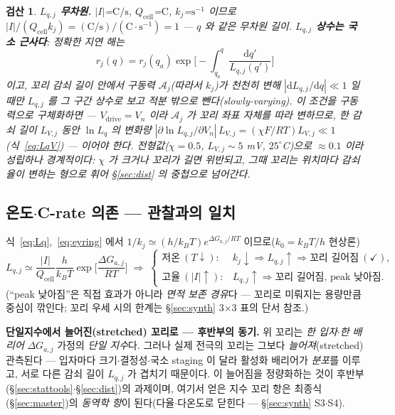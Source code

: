 \documentclass[11pt,a4paper]{article}
\newtheorem*{verifybox}{검산}
\newcommand{\dd}{\mathrm{d}}
\newcommand{\drive}{\mathrm{drive}}
\newcommand{\cell}{\mathrm{cell}}
\begin{document}
\begin{verifybox}
\textbf{$L_{q,j}$ 무차원.} $|I|$=$\mathrm{C/s}$, $Q_\cell$=$\mathrm C$, $k_j$=$\mathrm{s^{-1}}$ 이므로
$|I|/(Q_\cell k_j)=(\mathrm{C/s})/(\mathrm C\cdot\mathrm{s^{-1}})=1$ — $q$ 와 같은 무차원 길이. \textbf{$L_{q,j}$ 상수는
\emph{국소 근사}다}: 정확한 지연 해는
\[ r_j(q)=r_j(q_a)\exp\!\Big[-\int_{q_a}^q\frac{\dd q'}{L_{q,j}(q')}\Big] \]
이고, 꼬리 감쇠 길이 안에서 구동력 $\mathcal A_j$(따라서 $k_j$)가 천천히 변해 $|\dd L_{q,j}/\dd q|\ll1$ 일 때만 $L_{q,j}$ 를
그 구간 상수로 보고 적분 밖으로 뺀다(slowly-varying). 이 조건을 구동력으로 구체화하면 — $V_\drive=V_n$ 이라 $\mathcal A_j$
가 꼬리 좌표 자체를 따라 변하므로, 한 감쇠 길이 $L_{V,j}$ 동안 $\ln L_q$ 의 변화량
$|\partial\ln L_{q,j}/\partial V_n|\,L_{V,j}=(\chi F/RT)L_{V,j}\ll1$(식~\eqref{eq:LqV}) — 이어야 한다. 전형값($\chi=0.5$,
$L_{V,j}\sim5$ mV, $25^\circ$C)으로 $\approx0.1$ 이라 성립하나 \emph{경계적}이다: $\chi$ 가 크거나 꼬리가 길면 위반되고,
그때 꼬리는 위치마다 감쇠율이 변하는 형으로 휘어 \S\ref{sec:dist} 의 중첩으로 넘어간다.
\end{verifybox}

\subsection{온도$\cdot$C-rate 의존 — 관찰과의 일치}
식~\eqref{eq:Lq},~\eqref{eq:eyring} 에서 $1/k_j\simeq(h/k_BT)e^{\Delta G_{a,j}/RT}$ 이므로($k_0=k_BT/h$ 현상론)
\begin{equation}
L_{q,j}\simeq\frac{|I|}{Q_\cell}\frac{h}{k_BT}\exp\!\Big[\frac{\Delta G_{a,j}}{RT}\Big]
\;\Longrightarrow\;
\begin{cases}
\text{저온}\ (T\downarrow): & k_j\downarrow\Rightarrow L_{q,j}\uparrow\Rightarrow\text{꼬리 길어짐}\ (\checkmark),\\[2pt]
\text{고율}\ (|I|\uparrow): & L_{q,j}\uparrow\Rightarrow\text{꼬리 길어짐, peak 낮아짐}.
\end{cases}
\label{eq:tailTC}
\end{equation}
(``peak 낮아짐''은 직접 효과가 아니라 \emph{면적 보존 경유}다 — 꼬리로 미뤄지는 용량만큼 중심이 깎인다;
꼬리 우세 시의 한계는 \S\ref{sec:synth} 3$\times$3 표의 단서 참조.)

\textbf{단일지수에서 늘어진(stretched) 꼬리로 — 후반부의 동기.} 위 꼬리는 \emph{한 입자$\cdot$한 배리어}
$\Delta G_{a,j}$ 가정의 \emph{단일 지수}다. 그러나 실제 전극의 꼬리는 그보다 \emph{늘어져}(stretched) 관측된다 —
입자마다 크기$\cdot$결정성$\cdot$국소 staging 이 달라 활성화 배리어가 \emph{분포}를 이루고, 서로 다른 감쇠 길이
$L_{q,j}$ 가 겹치기 때문이다. 이 늘어짐을 정량화하는 것이 후반부(\S\ref{sec:stattools}$\cdot$\S\ref{sec:dist})의
과제이며, 여기서 얻은 지수 꼬리 항은 최종식(\S\ref{sec:master})의 \emph{동역학 항}이 된다(다율$\cdot$다온도로
닫힌다 — \S\ref{sec:synth} S3$\cdot$S4).
\end{document}
